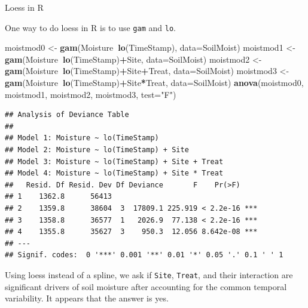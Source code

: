 \documentclass[
  ignorenonframetext,
]{beamer}
\newenvironment{Shaded}{\begin{snugshade}}{\end{snugshade}}
\newcommand{\DataTypeTok}[1]{\textcolor[rgb]{0.13,0.29,0.53}{#1}}
\newcommand{\KeywordTok}[1]{\textcolor[rgb]{0.13,0.29,0.53}{\textbf{#1}}}
\newcommand{\NormalTok}[1]{#1}
\newcommand{\OperatorTok}[1]{\textcolor[rgb]{0.81,0.36,0.00}{\textbf{#1}}}
\newcommand{\StringTok}[1]{\textcolor[rgb]{0.31,0.60,0.02}{#1}}
\begin{document}
\begin{frame}[fragile]{Loess in R}
\protect\hypertarget{loess-in-r}{}

One way to do loess in R is to use \texttt{gam} and \texttt{lo}.

\scriptsize

\begin{Shaded}
\begin{Highlighting}[]
\NormalTok{moistmod0 <-}\StringTok{ }\KeywordTok{gam}\NormalTok{(Moisture}\OperatorTok{~}\KeywordTok{lo}\NormalTok{(TimeStamp), }\DataTypeTok{data=}\NormalTok{SoilMoist)}
\NormalTok{moistmod1 <-}\StringTok{ }\KeywordTok{gam}\NormalTok{(Moisture}\OperatorTok{~}\KeywordTok{lo}\NormalTok{(TimeStamp)}\OperatorTok{+}\NormalTok{Site, }\DataTypeTok{data=}\NormalTok{SoilMoist)}
\NormalTok{moistmod2 <-}\StringTok{ }\KeywordTok{gam}\NormalTok{(Moisture}\OperatorTok{~}\KeywordTok{lo}\NormalTok{(TimeStamp)}\OperatorTok{+}\NormalTok{Site}\OperatorTok{+}\NormalTok{Treat, }\DataTypeTok{data=}\NormalTok{SoilMoist)}
\NormalTok{moistmod3 <-}\StringTok{ }\KeywordTok{gam}\NormalTok{(Moisture}\OperatorTok{~}\KeywordTok{lo}\NormalTok{(TimeStamp)}\OperatorTok{+}\NormalTok{Site}\OperatorTok{*}\NormalTok{Treat, }\DataTypeTok{data=}\NormalTok{SoilMoist)}
\KeywordTok{anova}\NormalTok{(moistmod0, moistmod1, moistmod2, moistmod3, }\DataTypeTok{test=}\StringTok{"F"}\NormalTok{)}
\end{Highlighting}
\end{Shaded}

\begin{verbatim}
## Analysis of Deviance Table
## 
## Model 1: Moisture ~ lo(TimeStamp)
## Model 2: Moisture ~ lo(TimeStamp) + Site
## Model 3: Moisture ~ lo(TimeStamp) + Site + Treat
## Model 4: Moisture ~ lo(TimeStamp) + Site * Treat
##   Resid. Df Resid. Dev Df Deviance       F    Pr(>F)    
## 1    1362.8      56413                                  
## 2    1359.8      38604  3  17809.1 225.919 < 2.2e-16 ***
## 3    1358.8      36577  1   2026.9  77.138 < 2.2e-16 ***
## 4    1355.8      35627  3    950.3  12.056 8.642e-08 ***
## ---
## Signif. codes:  0 '***' 0.001 '**' 0.01 '*' 0.05 '.' 0.1 ' ' 1
\end{verbatim}

\normalsize

Using loess instead of a spline, we ask if \texttt{Site},
\texttt{Treat}, and their interaction are significant drivers of soil
moisture after accounting for the common temporal variability. It
appears that the answer is yes.

\end{frame}
\end{document}
